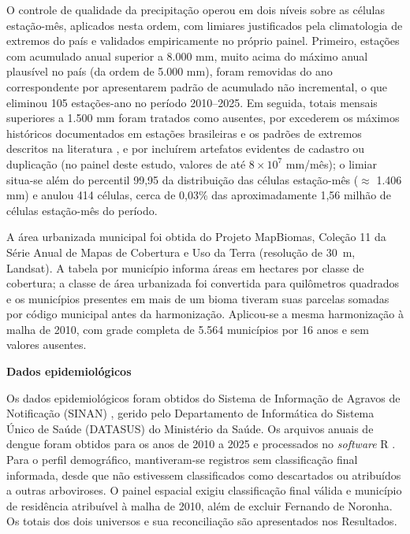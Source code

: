 O controle de qualidade da precipitação operou em dois níveis sobre as células estação-mês, aplicados nesta ordem, com limiares justificados pela climatologia de extremos do país e validados empiricamente no próprio painel. Primeiro, estações com acumulado anual superior a 8.000 mm, muito acima do máximo anual plausível no país (da ordem de 5.000 mm), foram removidas do ano correspondente por apresentarem padrão de acumulado não incremental, o que eliminou 105 estações-ano no período 2010--2025. Em seguida, totais mensais superiores a 1.500 mm foram tratados como ausentes, por excederem os máximos históricos documentados em estações brasileiras e os padrões de extremos descritos na literatura \cite{regoto2021}, e por incluírem artefatos evidentes de cadastro ou duplicação (no painel deste estudo, valores de até $8 \times 10^{7}$ mm/mês); o limiar situa-se além do percentil 99,95 da distribuição das células estação-mês ($\approx$ 1.406 mm) e anulou 414 células, cerca de 0,03\% das aproximadamente 1,56 milhão de células estação-mês do período.

A área urbanizada municipal foi obtida do Projeto MapBiomas, Coleção 11 da Série Anual de Mapas de Cobertura e Uso da Terra (resolução de 30~m, Landsat). A tabela por município informa áreas em hectares por classe de cobertura; a classe de área urbanizada foi convertida para quilômetros quadrados e os municípios presentes em mais de um bioma tiveram suas parcelas somadas por código municipal antes da harmonização. Aplicou-se a mesma harmonização à malha de 2010, com grade completa de 5.564 municípios por 16 anos e sem valores ausentes.

\noindent \textbf{Dados epidemiológicos}

Os dados epidemiológicos foram obtidos do Sistema de Informação de Agravos de Notificação (SINAN) \cite{datasus_sinan}, gerido pelo Departamento de Informática do Sistema Único de Saúde (DATASUS) do Ministério da Saúde. Os arquivos anuais de dengue foram obtidos para os anos de 2010 a 2025 e processados no \textit{software} R \cite{R}. Para o perfil demográfico, mantiveram-se registros sem classificação final informada, desde que não estivessem classificados como descartados ou atribuídos a outras arboviroses. O painel espacial exigiu classificação final válida e município de residência atribuível à malha de 2010, além de excluir Fernando de Noronha. Os totais dos dois universos e sua reconciliação são apresentados nos Resultados.

